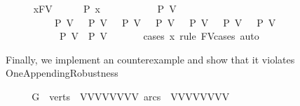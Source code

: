\begin{isabellebody}
\ \ \ \ \isamarkupfalse%
\ x{\isacharcolon}{\kern0pt}{\isacharcolon}{\kern0pt}FV\isanewline
\ \ \ \ \isamarkupfalse%
\ {\isachardoublequoteopen}P\ x\ {\isasymLongrightarrow}\isanewline
\ \ \ \ \ \ \ \ \ {\isasymnot}\ P\ V{}\ {\isasymLongrightarrow}\isanewline
\ \ \ \ \ \ \ \ \ {\isasymnot}\ P\ V{}\ {\isasymLongrightarrow}\ {\isasymnot}\ P\ V{}\ {\isasymLongrightarrow}\ {\isasymnot}\ P\ V{}\ {\isasymLongrightarrow}\ {\isasymnot}\ P\ V{}\ {\isasymLongrightarrow}\ {\isasymnot}\ P\ V{}\ {\isasymLongrightarrow}\ {\isasymnot}\ P\ V{}\ {\isasymLongrightarrow}\ {\isasymnot}\ P\ V{}\ {\isasymLongrightarrow}\ \isanewline
\ \ \ \ \ \ \ \ \ \ {\isasymnot}\ P\ V{}{}\ {\isasymLongrightarrow}\ P\ V{}\ {\isachardoublequoteclose}\ \isanewline
\ \ \ \ \isamarkupfalse%
{\isacharparenleft}{\kern0pt}cases\ x\ rule{\isacharcolon}{\kern0pt}\ FV{\isacharunderscore}{\kern0pt}cases{\isacharcomma}{\kern0pt}\ auto{\isacharparenright}{\kern0pt}\ \isamarkupfalse%
\isanewline
\ \ \isamarkupfalse%
\isanewline
{}\isamarkupfalse%
%
\endisatagproof
{\isafoldproof}%
%
\isadelimproof
\isanewline
%
\endisadelimproof
\isanewline
{}\isamarkupfalse%
%
\begin{isamarkuptext}%
Finally, we implement an counterexample and show that it violates OneAppendingRobustness%
\end{isamarkuptext}\isamarkuptrue%
\isamarkupfalse%
\ \isanewline
{}\isanewline
%
\isadelimproof
\ \ %
\endisadelimproof
%
\isatagproof
{}\isamarkupfalse%
\ {\isacharquery}{\kern0pt}G\ {\isacharequal}{\kern0pt}\ {\isachardoublequoteopen}{\isasymlparr}verts\ {\isacharequal}{\kern0pt}\ {\isacharbraceleft}{\kern0pt}V{}{\isacharcomma}{\kern0pt}V{}{\isacharcomma}{\kern0pt}V{}{\isacharcomma}{\kern0pt}V{}{\isacharcomma}{\kern0pt}V{}{\isacharcomma}{\kern0pt}V{}{\isacharcomma}{\kern0pt}V{}{\isacharcomma}{\kern0pt}V{}{\isacharbraceright}{\kern0pt}{\isacharcomma}{\kern0pt}\ arcs\ {\isacharequal}{\kern0pt}\ {\isacharbraceleft}{\kern0pt}{\isacharparenleft}{\kern0pt}V{}{\isacharcomma}{\kern0pt}V{}{\isacharparenright}{\kern0pt}{\isacharcomma}{\kern0pt}{\isacharparenleft}{\kern0pt}V{}{\isacharcomma}{\kern0pt}V{}{\isacharparenright}{\kern0pt}{\isacharcomma}{\kern0pt}{\isacharparenleft}{\kern0pt}V{}{\isacharcomma}{\kern0pt}V{}{\isacharparenright}{\kern0pt}{\isacharcomma}{\kern0pt}{\isacharparenleft}{\kern0pt}V{}{\isacharcomma}{\kern0pt}V{}{\isacharparenright}{\kern0pt}{\isacharcomma}{\kern0pt}\isanewline

\end{isabellebody}
